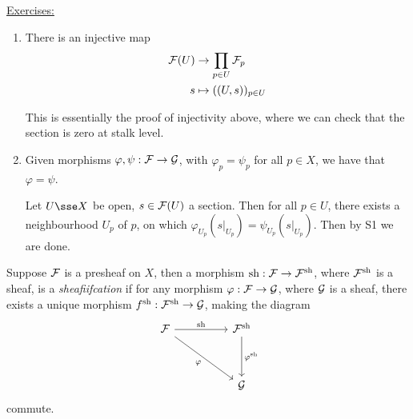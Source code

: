 \documentclass{article}
\begin{document}
\lec

\underline{Exercises:}
\begin{enumerate}
    \item There is an injective map
    \begin{align*}
        \mathcal{F}(U) &\to \prod_{p \in U}\mathcal{F}_p \\
        s &\mapsto ((U, s))_{p \in U}
    \end{align*}
    \begin{addendum}
        This is essentially the proof of injectivity above, where we can check that the section is zero at stalk level.
    \end{addendum}
    \item Given morphisms \(\varphi, \psi : \mathcal{F} \to \mathcal{G}\), with \(\varphi_p = \psi_p\) for all \(p \in X\), we have that \(\varphi = \psi\).
    \begin{addendum}
        Let \(U \sse X\) be open, \(s \in \mathcal{F}(U)\) a section. Then for all \(p \in U\), there exists a neighbourhood \(U_p\) of \(p\), on which \(\varphi_{U_p}(s \vert_{U_p}) = \psi_{U_p}(s\vert_{U_p})\). Then by S1 we are done.
    \end{addendum}
\end{enumerate}

\begin{definition}
    [sheafification] Suppose \(\mathcal{F}\) is a presheaf on \(X\), then a morphism \(\operatorname{sh} : \mathcal{F} \to \mathcal{F}^{\operatorname{sh}}\), where \(\mathcal{F}^{\operatorname{sh}}\) is a sheaf, is a \emph{sheafiifcation} if for any morphism \(\varphi : \mathcal{F} \to \mathcal{G}\), where \(\mathcal{G}\) is a sheaf, there exists a unique morphism \(f^{\operatorname{sh}} : \mathcal{F}^{\operatorname{sh}} \to \mathcal{G}\), making the diagram
\[\begin{tikzcd}
	\mcF && {\mcF^{\sh}} \\
	\\
	&& \mcG
	\arrow["\sh", from=1-1, to=1-3]
	\arrow["\varphi"', from=1-1, to=3-3]
	\arrow["{\varphi^{\sh}}", from=1-3, to=3-3]
\end{tikzcd}\]
    commute.
\end{definition}
\end{document}
